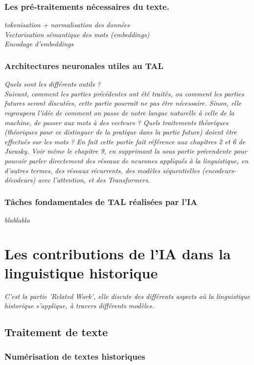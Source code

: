 \documentclass[12pt, letterpaper, french]{report}
\begin{document}
\subsection{Les pré-traitements nécessaires du texte.}
\textit{tokenisation + normalisation des données\\
    Vectorisation sémantique des mots (embeddings)\\
    Encodage d'embeddings}

\subsection{Architectures neuronales utiles au TAL}

\textit{Quels sont les différents outils ?}\\
\textit{Suivant, comment les parties précédentes ont été traités, ou comment les parties futures seront discutées, cette partie pourrait ne pas être nécessaire. Sinon, elle regroupera l'idée de comment on passe de notre langue naturelle à celle de la machine, de passer aux mots à des vecteurs ? Quels traitements théoriques (théoriques pour ce distinguer de la pratique dans la partie future) doient être effectués sur les mots ? En fait cette partie fait référence aux chapitres 2 et 6 de Jurasky. Voir même le chapitre 9, en supprimant la sous partie précendente pour pouvoir parler directement des réseaux de neurones appliqués à la linguistique, en d'autres termes, des réseaux récurrents, des modèles séquentielles (encodeurs-décodeurs) avec l'attention, et des Transformers.}

\subsection{Tâches fondamentales de TAL réalisées par l'IA}
\textit{blablabla}\\

\chapter{Les contributions de l'IA dans la linguistique historique}
\textit{C'est la partie 'Related Work', elle discute des différents aspects où la linguistique historique s'applique, à travers différents modèles.}
\section{Traitement de texte}
\subsection{Numérisation de textes historiques}
\end{document}
